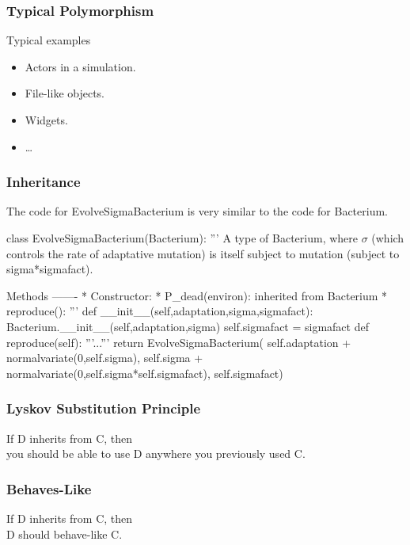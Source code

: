 \begin{frame}[fragile]
\frametitle{Typical Polymorphism}
\begin{block}{Typical examples}
\begin{itemize}
\item Actors in a simulation.
\item File-like objects.
\item Widgets.
\item \ldots
\end{itemize}
\end{block}
\end{frame}

\begin{frame}[fragile]
\frametitle{Inheritance}

The code for EvolveSigmaBacterium is very similar to the code for Bacterium.

\end{frame}

\begin{frame}[fragile]

\begin{python}
class EvolveSigmaBacterium(Bacterium):
    '''
    A type of Bacterium, where $\sigma$ (which controls
    the rate of adaptative mutation) is itself subject
    to mutation (subject to sigma*sigmafact).

    Methods
    -------
        * Constructor:
        * P_dead(environ): inherited from Bacterium
        * reproduce(): 
    '''
    def __init__(self,adaptation,sigma,sigmafact):
        Bacterium.__init__(self,adaptation,sigma)
        self.sigmafact = sigmafact
    def reproduce(self):
        '''...'''
        return EvolveSigmaBacterium(
           self.adaptation + normalvariate(0,self.sigma),
           self.sigma + normalvariate(0,self.sigma*self.sigmafact),
           self.sigmafact)
\end{python}
\end{frame}

\begin{frame}[fragile]
\frametitle{Lyskov Substitution Principle}

If D inherits from C, then\\
you should be able to use D anywhere you previously used C.

\end{frame}

\begin{frame}[fragile]
\frametitle{Behaves-Like}

If D inherits from C, then\\
D should behave-like C.

\end{frame}

